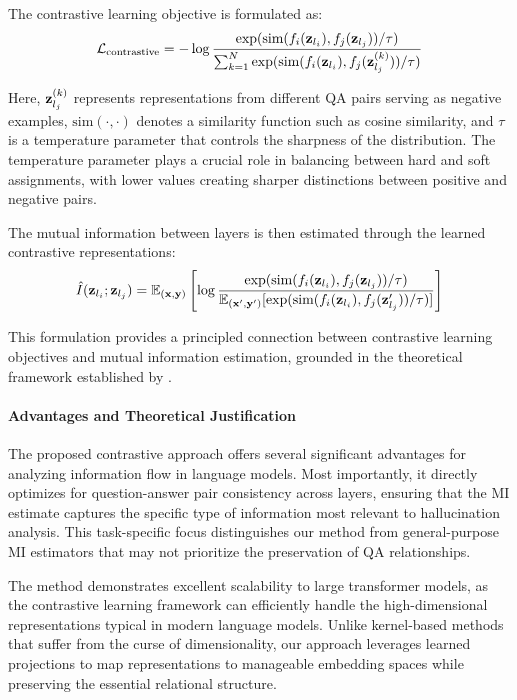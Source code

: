 The contrastive learning objective is formulated as:
\[
\mathcal{L}_{\text{contrastive}} = -\log \frac{\exp(\text{sim}(f_i({\mathbf{z}}_{l_i}), f_j({\mathbf{z}}_{l_j})) / \tau)}{\sum_{k=1}^{N} \exp(\text{sim}(f_i({\mathbf{z}}_{l_i}), f_j({\mathbf{z}}_{l_j}^{(k)})) / \tau)}
\]

Here, ${\mathbf{z}}_{l_j}^{(k)}$ represents representations from different QA pairs serving as negative examples, $\text{sim}(\cdot, \cdot)$ denotes a similarity function such as cosine similarity, and $\tau$ is a temperature parameter that controls the sharpness of the distribution. The temperature parameter plays a crucial role in balancing between hard and soft assignments, with lower values creating sharper distinctions between positive and negative pairs.

The mutual information between layers is then estimated through the learned contrastive representations:
\[
\hat{I}({\mathbf{z}}_{l_i}; {\mathbf{z}}_{l_j}) = \mathbb{E}_{({\mathbf{x}},{\mathbf{y}})} \left[ \log \frac{\exp(\text{sim}(f_i({\mathbf{z}}_{l_i}), f_j({\mathbf{z}}_{l_j})) / \tau)}{\mathbb{E}_{({\mathbf{x}}',{\mathbf{y}}')} [\exp(\text{sim}(f_i({\mathbf{z}}_{l_i}), f_j({\mathbf{z}}_{l_j}')) / \tau)]} \right]
\]

This formulation provides a principled connection between contrastive learning objectives and mutual information estimation, grounded in the theoretical framework established by \citet{poole2019variational}.

\paragraph{Advantages and Theoretical Justification}

The proposed contrastive approach offers several significant advantages for analyzing information flow in language models. Most importantly, it directly optimizes for question-answer pair consistency across layers, ensuring that the MI estimate captures the specific type of information most relevant to hallucination analysis. This task-specific focus distinguishes our method from general-purpose MI estimators that may not prioritize the preservation of QA relationships.

The method demonstrates excellent scalability to large transformer models, as the contrastive learning framework can efficiently handle the high-dimensional representations typical in modern language models. Unlike kernel-based methods that suffer from the curse of dimensionality, our approach leverages learned projections to map representations to manageable embedding spaces while preserving the essential relational structure.

